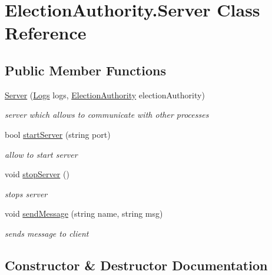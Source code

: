 \hypertarget{class_election_authority_1_1_server}{}\section{Election\+Authority.\+Server Class Reference}
\label{class_election_authority_1_1_server}
\subsection*{Public Member Functions}
\begin{DoxyCompactItemize}
\item 
\hyperlink{class_election_authority_1_1_server_a60c4762524e5a2beb79b1305eb750ec6}{Server} (\hyperlink{class_election_authority_1_1_logs}{Logs} logs, \hyperlink{class_election_authority_1_1_election_authority}{Election\+Authority} election\+Authority)
\begin{DoxyCompactList}\small\item\em server which allows to communicate with other processes \end{DoxyCompactList}\item 
bool \hyperlink{class_election_authority_1_1_server_a24b27b5540dafbfc8e47d28e797daabe}{start\+Server} (string port)
\begin{DoxyCompactList}\small\item\em allow to start server \end{DoxyCompactList}\item 
void \hyperlink{class_election_authority_1_1_server_a4e68a6b5d8a483fe1f3064981558c2c5}{stop\+Server} ()
\begin{DoxyCompactList}\small\item\em stops server \end{DoxyCompactList}\item 
void \hyperlink{class_election_authority_1_1_server_ae7470865c5780cb90bf0ca53d6098f32}{send\+Message} (string name, string msg)
\begin{DoxyCompactList}\small\item\em sends message to client \end{DoxyCompactList}\end{DoxyCompactItemize}


\subsection{Constructor \& Destructor Documentation}
\hypertarget{class_election_authority_1_1_server_a60c4762524e5a2beb79b1305eb750ec6}{}
